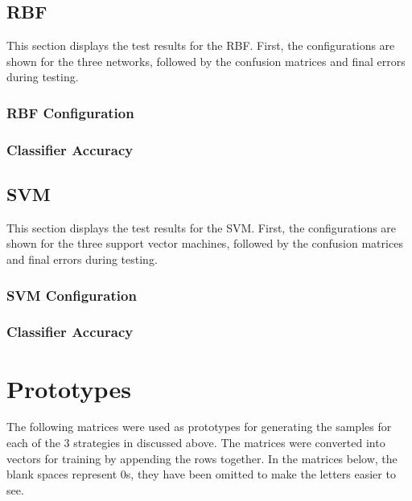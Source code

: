 \documentclass{article}
\begin{document}
		\subsection{RBF}
			This section displays the test results for the RBF. First, the configurations are shown for the three networks, followed by the confusion matrices and final errors during testing.
		
			\subsubsection{RBF Configuration}
			\subsubsection{Classifier Accuracy}	
		
		\subsection{SVM}
			This section displays the test results for the SVM. First, the configurations are shown for the three support vector machines, followed by the confusion matrices and final errors during testing.
			\subsubsection{SVM Configuration}
			\subsubsection{Classifier Accuracy}
	
	\section{Prototypes}\label{S6}
	The following matrices were used as prototypes for generating the samples for each of the 3 strategies in discussed above. The matrices were converted into vectors for training by appending the rows together. In the matrices below, the blank spaces represent 0s, they have been omitted to make the letters easier to see. 
	
\end{document}
